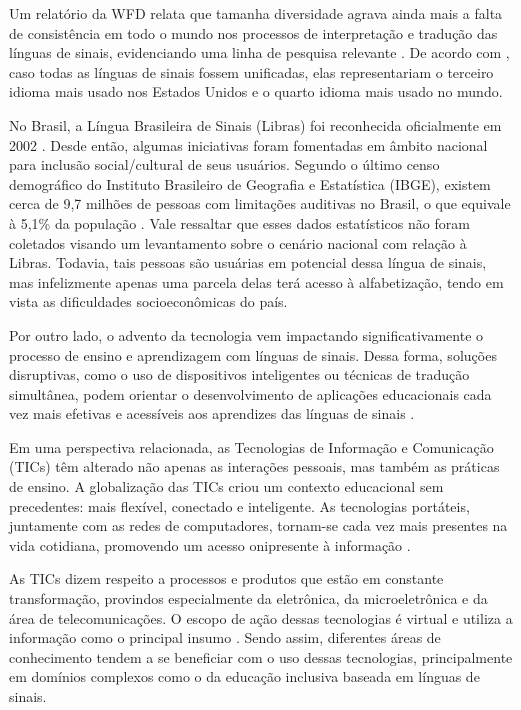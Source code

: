 Um relatório da WFD relata que tamanha diversidade agrava ainda mais a falta de consistência em todo o mundo nos processos de interpretação e tradução das línguas de sinais, evidenciando uma linha de pesquisa relevante \cite{Napier2019}. De acordo com , caso todas as línguas de sinais fossem unificadas, elas representariam o terceiro idioma mais usado nos Estados Unidos e o quarto idioma mais usado no mundo.

No Brasil, a Língua Brasileira de Sinais (Libras) foi reconhecida oficialmente em 2002 \cite{Quadros2019, Honora2017}. Desde então, algumas iniciativas foram fomentadas em âmbito nacional para inclusão social/cultural de seus usuários. Segundo o último censo demográfico do Instituto Brasileiro de Geografia e Estatística (IBGE), existem cerca de 9,7 milhões de pessoas com limitações auditivas no Brasil, o que equivale à 5,1\% da população \cite{IBGE2010}. Vale ressaltar que esses dados estatísticos não foram coletados visando um levantamento sobre o cenário nacional com relação à Libras. Todavia, tais pessoas são usuárias em potencial dessa língua de sinais, mas infelizmente apenas uma parcela delas terá acesso à alfabetização, tendo em vista as dificuldades socioeconômicas do país.

Por outro lado, o advento da tecnologia vem impactando significativamente o processo de ensino e aprendizagem com línguas de sinais. Dessa forma, soluções disruptivas, como o uso de dispositivos inteligentes ou técnicas de tradução simultânea, podem orientar o desenvolvimento de aplicações educacionais cada vez mais efetivas e acessíveis aos aprendizes das línguas de sinais \cite{Napier2019}.

Em uma perspectiva relacionada, as Tecnologias de Informação e Comunicação (TICs) têm alterado não apenas as interações pessoais, mas também as práticas de ensino. A globalização das TICs criou um contexto educacional sem precedentes: mais flexível, conectado e inteligente. As tecnologias portáteis, juntamente com as redes de computadores, tornam-se cada vez mais presentes na vida cotidiana, promovendo um acesso onipresente à informação \cite{Cilli2017}.

As TICs dizem respeito a processos e produtos que estão em constante transformação, provindos especialmente da eletrônica, da microeletrônica e da área de telecomunicações. O escopo de ação dessas tecnologias é virtual e utiliza a informação como o principal insumo \cite{Cilli2017}. Sendo assim, diferentes áreas de conhecimento tendem a se beneficiar com o uso dessas tecnologias, principalmente em domínios complexos como o da educação inclusiva baseada em línguas de sinais.

